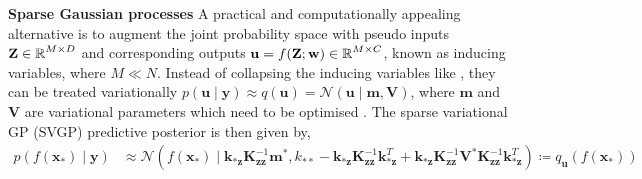 \documentclass{article}
\newcommand{\inducingInput}{\ensuremath{\mathbf{Z}}}
\newcommand{\inducingVariable}{\ensuremath{\mathbf{u}}}
\newcommand{\transitionParams}{\ensuremath{\mathbf{w}}}
\begin{document}
\textbf{Sparse Gaussian processes}
A practical and computationally appealing alternative is to augment the joint probability space with pseudo inputs $\mathbf{Z} \in \operatorname{\mathbb{R}}^{M \times D}$
and corresponding outputs
$\mathbf{u} = f(\mathbf{Z}; \transitionParams) \in \R^{M \times C}$, known as inducing variables, where $M \ll N$.
Instead of collapsing the inducing variables like \cite{titsiasVariational2009}, they can be treated variationally
$p(\mathbf{u} \mid \mathbf{y}) \approx q(\mathbf{u}) = \mathcal{N}\left( \mathbf{u} \mid \mathbf{m}, \mathbf{V} \right)$, where $\mathbf{m}$ and $\mathbf{V}$ are variational parameters
which need to be optimised \citep{hensmanGaussian2013}.
The sparse variational GP (SVGP) predictive posterior is then given by,
\begin{align}
\label{eq-dual-svgp-predictive-posterior}
  p(f(\mathbf{x}_{*}) \mid \mathbf{y})
&\approx \mathcal{N} \left( f(\mathbf{x}_{*}) \mid \mathbf{k}_{*\mathbf{z}} \mathbf{K}^{-1}_{\mathbf{z}\mathbf{z}} \mathbf{m}^{*},
  k_{**} - \mathbf{k}_{*\mathbf{z}} \mathbf{K}^{-1}_{\mathbf{z}\mathbf{z}} \mathbf{k}_{*\mathbf{z}}^{T}
  + \mathbf{k}_{*\mathbf{z}} \mathbf{K}^{-1}_{\mathbf{z}\mathbf{z}}  \mathbf{V}^{*}  \mathbf{K}^{-1}_{\mathbf{z}\mathbf{z}} \mathbf{k}_{*\mathbf{z}}^{T}
  \right)
\coloneqq q_{\inducingVariable}(f(\mathbf{x}_{*}))
\end{align}
\end{document}
